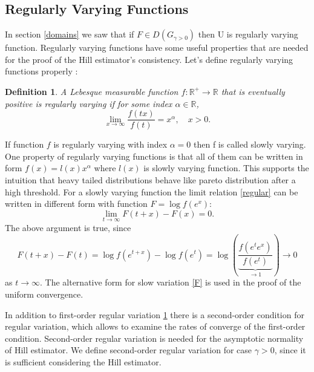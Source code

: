 \documentclass[english,12pt,a4paper,pdftex,sci,utf8]{aaltothesis} %
\newtheorem{definition}[theorem]{Definition}
\begin{document}
\subsection{Regularly Varying Functions}

In section \ref{domains} we saw that if $F \in D(G_{\gamma>0})$ then U is regularly varying function. Regularly varying functions have some useful properties that are needed for the proof of the Hill estimator's consistency. Let's define regularly varying functions properly \cite{deHaan}:
\begin{definition}
A Lebesque measurable function $f: \mathbb{R}^{+} \rightarrow \mathbb{R}$ that is eventually positive is regularly varying if for some index $\alpha \in \mathbb{R}$,
\begin{equation}
\lim_{x \rightarrow \infty} \frac{f(tx)}{f(t)} = x^{\alpha}, \quad x>0.
\label{regular}
\end{equation}
\label{regularDef}
\end{definition}

If function $f$  is regularly varying with index $\alpha=0$ then f is called slowly varying. One property of regularly varying functions is that all of them can be written in form $f(x)=l(x)x^{\alpha}$ where $l(x)$ is slowly varying function. This supports the intuition that heavy tailed distributions behave like pareto distribution after a high threshold. For a slowly varying function the limit relation \ref{regular} can be written in different form with function $F=\log f(e^x)$:
\begin{equation}
\lim_{t \rightarrow \infty} F(t+x)-F(x) = 0.
\label{F}
\end{equation}
The above argument is true, since
\begin{equation*}
F(t+x)-F(t) = \log f(e^{t+x}) - \log f(e^{t}) = \log \left(\underbrace{\frac{f(e^te^x)}{f(e^t)}}_{\rightarrow 1}\right) \rightarrow 0
\end{equation*}
as $t \rightarrow \infty$. The alternative form for slow variation \ref{F} is used in the proof of the uniform convergence.

In addition to first-order regular variation \ref{regularDef} there is a second-order condition for regular variation, which allows to examine the rates of converge of the first-order condition. Second-order regular variation is needed for the asymptotic normality of Hill estimator. We define second-order regular variation for case $\gamma > 0$, since it is sufficient considering the Hill estimator.
\end{document}
